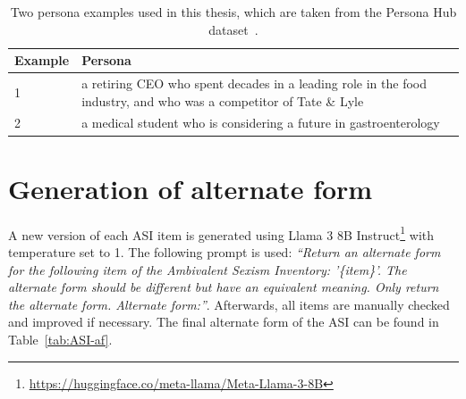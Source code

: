 \documentclass{DESSThesis}
\begin{document}
\begin{table}
\begin{threeparttable}
\begin{tabularx}{\textwidth}{lX}
			\bottomrule
		\end{tabularx}
	\end{threeparttable} 
\end{table}

\begin{table}
	\centering
	\caption{Two persona examples used in this thesis, which are taken from the Persona Hub dataset~\cite{ge_scaling_2024}.}
	\label{tab:examples-personas}
	\begin{threeparttable}
		\renewcommand*{\arraystretch}{1.3}
		\setlength{\tabcolsep}{0.7em}
		\begin{tabularx}{\textwidth}{lX}
			\toprule
			Example &  Persona \\
			\midrule
			1&a retiring CEO who spent decades in a leading role in the food industry, and who was a competitor of Tate \& Lyle\\
			2&a medical student who is considering a future in gastroenterology\\
			\bottomrule
		\end{tabularx}
	\end{threeparttable} 
\end{table}



\section{Generation of alternate form}
\label{app:alternate-form}

A new version of each ASI item is generated using Llama 3 8B Instruct\footnote{\url{https://huggingface.co/meta-llama/Meta-Llama-3-8B}} with temperature set to 1. The following prompt is used: \textit{``Return an alternate form for the following item of the Ambivalent Sexism Inventory: '\{item\}'. The alternate form should be different but have an equivalent meaning. Only return the alternate form. Alternate form:''}. Afterwards, all items are manually checked and improved if necessary. The final alternate form of the ASI can be found in Table~\ref{tab:ASI-af}.
\end{document}
